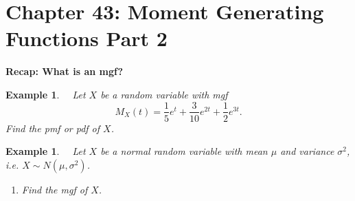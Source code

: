 \documentclass[12pt]{amsart}
\newtheorem{example}[theorem]{Example}
\newcommand\gs{\sigma}
\newcommand\mgfX{M_X(t)}
\begin{document}
\setcounter{section}{43}
{\huge  
\section*{Chapter 43: Moment Generating Functions \newline
Part 2}
}

{\large %



\vspace{.5cm}
\textbf{Recap: What is an mgf?} 



\vspace{5cm}

\begin{example} \ \  Let $X$ be a random variable with mgf
$$
\mgfX = \frac{1}{5}e^t + \frac{3}{10}e^{2t} + \frac{1}{2}e^{3t}.
$$
Find the pmf or pdf of $X$.

\end{example}




\newpage

\begin{example} \ \  Let $X$ be a normal random variable with mean $\mu$ and variance $\gs^2$, i.e. $X \sim N(\mu,\gs^2)$. 

\begin{enumerate}
\item Find the mgf of $X$.


\end{enumerate}
\end{example}}
\end{document}

